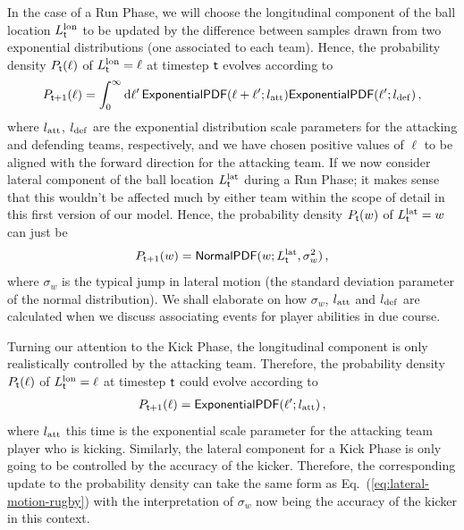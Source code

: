 In the case of a {\sf Run Phase}, we will choose the longitudinal component of the ball location $L^{\rm lon}_{{\sf t}}$ to be updated by the difference between samples drawn from two exponential distributions (one associated to each team). Hence, the probability density $P_{{\sf t}}(\ell )$ of $L^{\rm lon}_{{\sf t}}=\ell$ at timestep ${\sf t}$ evolves according to
\begin{align}
P_{{\sf t}+1}(\ell ) = \int^\infty_0 {\rm d}\ell'\, {\sf ExponentialPDF}(\ell + \ell'; l_{\rm att}){\sf ExponentialPDF}(\ell'; l_{\rm def}) \,,
\end{align}
where $l_{\rm att}$, $l_{\rm def}$ are the exponential distribution scale parameters for the attacking and defending teams, respectively, and we have chosen positive values of $\ell$ to be aligned with the forward direction for the attacking team. If we now consider lateral component of the ball location $L^{\rm lat}_{{\sf t}}$ during a {\sf Run Phase}; it makes sense that this wouldn't be affected much by either team within the scope of detail in this first version of our model. Hence, the probability density $P_{{\sf t}}(w)$ of $L^{\rm lat}_{{\sf t}}=w$ can just be 
\begin{align}
P_{{\sf t}+1}(w) = {\sf NormalPDF}(w; L^{\rm lat}_{{\sf t}}, \sigma_w^2) \label{eq:lateral-motion-rugby} \,,
\end{align}
where $\sigma_w$ is the typical jump in lateral motion (the standard deviation parameter of the normal distribution). We shall elaborate on how $\sigma_w$, $l_{\rm att}$ and $l_{\rm def}$ are calculated when we discuss associating events for player abilities in due course.

Turning our attention to the {\sf Kick Phase}, the longitudinal component is only realistically controlled by the attacking team. Therefore, the probability density $P_{{\sf t}}(\ell )$ of $L^{\rm lon}_{{\sf t}}=\ell$ at timestep ${\sf t}$ could evolve according to
\begin{align}
P_{{\sf t}+1}(\ell ) = {\sf ExponentialPDF}(\ell'; l_{\rm att}) \,,
\end{align}
where $l_{\rm att}$ this time is the exponential scale parameter for the attacking team player who is kicking. Similarly, the lateral component for a {\sf Kick Phase} is only going to be controlled by the accuracy of the kicker. Therefore, the corresponding update to the probability density can take the same form as Eq.~(\ref{eq:lateral-motion-rugby}) with the interpretation of $\sigma_w$ now being the accuracy of the kicker in this context.

